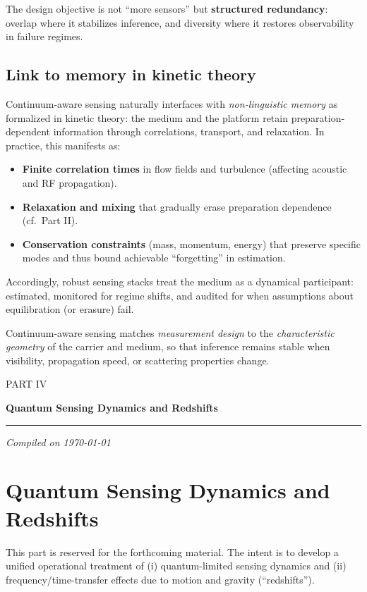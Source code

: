 \documentclass[11pt]{article}
\theoremstyle{defstyle}
\theoremstyle{mapstyle}
\newenvironment{keyinsight}
{\begin{tcolorbox}[
  enhanced,
  colback=keybox,
  colframe=headerblue,
  boxrule=1.2pt,
  arc=4pt,
  left=10pt,right=10pt,top=10pt,bottom=10pt,
  before skip=12pt,after skip=12pt
]}
{\end{tcolorbox}}
\newcommand{\setdocheader}[1]{%
  \fancyhead[L]{\color{headerblue}\footnotesize\textbf{#1}}%
}
\newcommand{\PartDivider}[2]{%
  \clearpage
  \thispagestyle{empty}
  \begin{center}
    \vspace*{1.8cm}
    \begin{tcolorbox}[
      enhanced,
      breakable,
      colback=partbg,
      colframe=partframe,
      boxrule=1.2pt,
      arc=2.5mm,
      left=10mm,right=10mm,top=8mm,bottom=8mm,
      width=0.92\textwidth
    ]
      \centering
      {\Large\scshape\color{headerblue}#1}\par
      \vspace{0.6em}
      {\huge\bfseries\color{headerblue}#2}\par
      \vspace{0.9em}
      {\color{headerblue!70}\rule{0.72\textwidth}{0.9pt}}\par
      \vspace{0.8em}
      {\large\itshape\color{headerblue!85}Compiled on \today}\par
    \end{tcolorbox}
  \end{center}
  \clearpage
}
\begin{document}
The design objective is not ``more sensors'' but \textbf{structured redundancy}: overlap where it stabilizes inference, and diversity where it restores observability in failure regimes.

\subsection{Link to memory in kinetic theory}
Continuum-aware sensing naturally interfaces with \emph{non-linguistic memory} as formalized in kinetic theory: the medium and the platform retain preparation-dependent information through correlations, transport, and relaxation.
In practice, this manifests as:
\begin{itemize}[leftmargin=*, itemsep=3pt]
  \item \textbf{Finite correlation times} in flow fields and turbulence (affecting acoustic and RF propagation).
  \item \textbf{Relaxation and mixing} that gradually erase preparation dependence (cf.\ Part II).
  \item \textbf{Conservation constraints} (mass, momentum, energy) that preserve specific modes and thus bound achievable ``forgetting'' in estimation.
\end{itemize}

Accordingly, robust sensing stacks treat the medium as a dynamical participant: estimated, monitored for regime shifts, and audited for when assumptions about equilibration (or erasure) fail.

\begin{keyinsight}
Continuum-aware sensing matches \emph{measurement design} to the \emph{characteristic geometry} of the carrier and medium, so that inference remains stable when visibility, propagation speed, or scattering properties change.
\end{keyinsight}


\PartDivider{PART IV}{Quantum Sensing Dynamics and Redshifts}
{}
\setdocheader{QUANTUM SENSING \& REDSHIFTS}

\section{Quantum Sensing Dynamics and Redshifts}
\label{sec:quantum_redshifts}

This part is reserved for the forthcoming material.
The intent is to develop a unified operational treatment of (i) quantum-limited sensing dynamics and (ii) frequency/time-transfer effects due to motion and gravity (``redshifts'').
\end{document}
